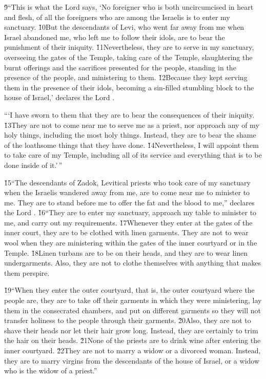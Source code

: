 \v{9}``This is what the Lord  says, `No foreigner who is both uncircumcised in heart and flesh, of all the foreigners who are among the Israelis is to enter my sanctuary. \v{10}But the descendants of Levi, who went far away from me when Israel abandoned me, who left me to follow their idols, are to bear the punishment of their iniquity. \v{11}Nevertheless, they are to serve in my sanctuary, overseeing the gates of the Temple, taking care of the Temple, slaughtering the burnt offerings and the sacrifices presented for the people, standing in the presence of the people, and ministering to them. \v{12}Because they kept serving them in the presence of their idols, becoming a sin-filled stumbling block to the house of Israel,' declares the Lord .

```I have sworn to them that they are to bear the consequences of their iniquity. \v{13}They are not to come near me to serve me as a priest, nor approach any of my holy things, including the most holy things. Instead, they are to bear the shame of the loathsome things that they have done. \v{14}Nevertheless, I will appoint them to take care of my Temple, including all of its service and everything that is to be done inside of it.'\,''

\v{15}``The descendants of Zadok, Levitical priests who took care of my sanctuary when the Israelis wandered away from me, are to come near me to minister to me. They are to stand before me to offer the fat and the blood to me,'' declares the Lord . \v{16}``They are to enter my sanctuary, approach my table to minister to me, and carry out my requirements. \v{17}Whenever they enter at the gates of the inner court, they are to be clothed with linen garments. They are not to wear wool when they are ministering within the gates of the inner courtyard or in the Temple. \v{18}Linen turbans are to be on their heads, and they are to wear linen undergarments. Also, they are not to clothe themselves with anything that makes them perspire.

\v{19}``When they enter the outer courtyard, that is, the outer courtyard where the people are, they are to take off their garments in which they were ministering, lay them in the consecrated chambers, and put on different garments so they will not transfer holiness to the people through their garments. \v{20}Also, they are not to shave their heads nor let their hair grow long. Instead, they are certainly to trim the hair on their heads. \v{21}None of the priests are to drink wine after entering the inner courtyard. \v{22}They are not to marry a widow or a divorced woman. Instead, they are to marry virgins from the descendants of the house of Israel, or a widow who is the widow of a priest.''


